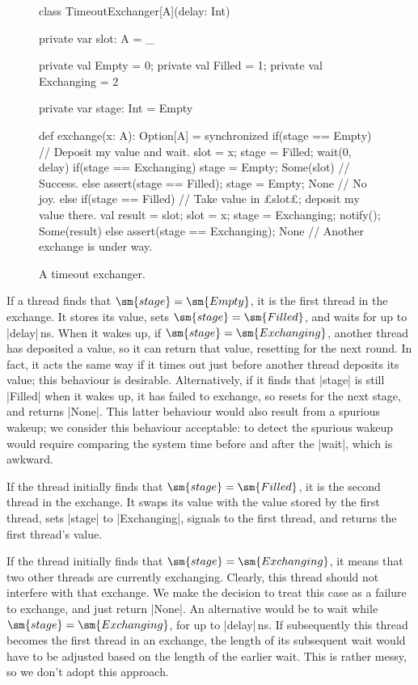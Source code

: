 
\begin{figure}
\begin{scala}
class TimeoutExchanger[A](delay: Int){
  private var slot: A = _

  private val Empty = 0; private val Filled = 1; private val Exchanging = 2

  private var stage: Int = Empty

  def exchange(x: A): Option[A] = synchronized{
    if(stage == Empty){
      // Deposit my value and wait.
      slot = x; stage = Filled; wait(0, delay)
      if(stage == Exchanging){ stage = Empty; Some(slot) } // Success.
      else{ assert(stage == Filled); stage = Empty; None } // No joy.
    }
    else if(stage == Filled){  // Take value in £slot£; deposit my value there.
      val result = slot; slot = x; stage = Exchanging; notify(); Some(result)
    }
    else{ assert(stage == Exchanging); None } // Another exchange is under way.
  }
}
\end{scala}
\caption{A timeout exchanger.}
\label{fig:TimeoutExchanger}
\end{figure}


If a thread finds that $\sm{stage} = \sm{Empty}$, it is the first thread in
the exchange.  It stores its value, sets $\sm{stage} = \sm{Filled}$, and
waits for up to |delay|\,ns.  When it wakes up, if $\sm{stage} =
\sm{Exchanging}$, another thread has deposited a value, so it can return that
value, resetting for the next round.  In fact, it acts the same way if it
times out just before another thread deposits its value; this behaviour is
desirable.  Alternatively, if it finds that |stage| is still |Filled| when it
wakes up, it has failed to exchange, so resets for the next stage, and returns
|None|.  This latter behaviour would also result from a spurious wakeup; we
consider this behaviour acceptable: to detect the spurious wakeup would
require comparing the system time before and after the |wait|, which is
awkward.  

If the thread initially finds that $\sm{stage} = \sm{Filled}$, it is the
second thread in the exchange.  It swaps its value with the value stored by
the first thread, sets |stage| to |Exchanging|, signals to the first thread,
and returns the first thread's value. 

If the thread initially finds that $\sm{stage} = \sm{Exchanging}$, it means
that two other threads are currently exchanging.  Clearly, this thread should
not interfere with that exchange.  We make the decision to treat this case as
a failure to exchange, and just return |None|.  An alternative would be to
wait while $\sm{stage} = \sm{Exchanging}$, for up to |delay|\,ns.  If
subsequently this thread becomes the first thread in an exchange, the length
of its subsequent wait would have to be adjusted based on the length of the
earlier wait.  This is rather messy, so we don't adopt this approach. 

